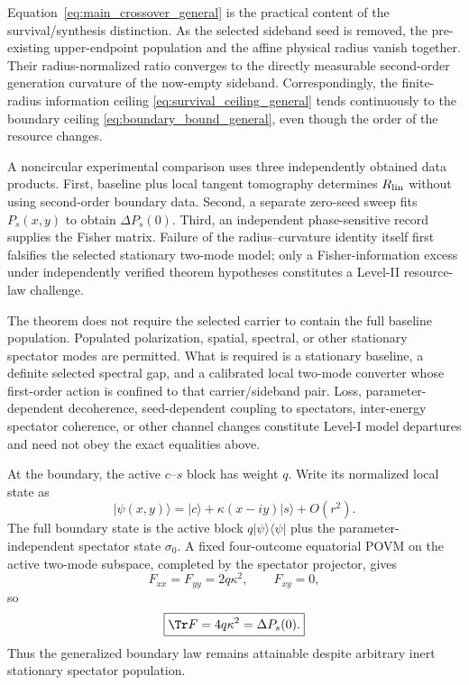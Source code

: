 Equation~\eqref{eq:main_crossover_general} is the practical content of the survival/synthesis distinction. As the selected sideband seed is removed, the pre-existing upper-endpoint population and the affine physical radius vanish together. Their radius-normalized ratio converges to the directly measurable second-order generation curvature of the now-empty sideband. Correspondingly, the finite-radius information ceiling \eqref{eq:survival_ceiling_general} tends continuously to the boundary ceiling \eqref{eq:boundary_bound_general}, even though the order of the resource changes.

A noncircular experimental comparison uses three independently obtained data products. First, baseline plus local tangent tomography determines $R_{\rm lin}$ without using second-order boundary data. Second, a separate zero-seed sweep fits $P_s(x,y)$ to obtain $\Delta P_s(0)$. Third, an independent phase-sensitive record supplies the Fisher matrix. Failure of the radius--curvature identity itself first falsifies the selected stationary two-mode model; only a Fisher-information excess under independently verified theorem hypotheses constitutes a Level-II resource-law challenge.

The theorem does not require the selected carrier to contain the full baseline population. Populated polarization, spatial, spectral, or other stationary spectator modes are permitted. What is required is a stationary baseline, a definite selected spectral gap, and a calibrated local two-mode converter whose first-order action is confined to that carrier/sideband pair. Loss, parameter-dependent decoherence, seed-dependent coupling to spectators, inter-energy spectator coherence, or other channel changes constitute Level-I model departures and need not obey the exact equalities above.

At the boundary, the active $c$--$s$ block has weight $q$. Write its normalized local state as
\begin{equation}
|\psi(x,y)\rangle
=|c\rangle+\kappa(x-iy)|s\rangle+O(r^2).
\end{equation}
The full boundary state is the active block $q|\psi\rangle\langle\psi|$ plus the parameter-independent spectator state $\sigma_0$. A fixed four-outcome equatorial POVM on the active two-mode subspace, completed by the spectator projector, gives
\begin{equation}
F_{xx}=F_{yy}=2q\kappa^2,
\qquad F_{xy}=0,
\end{equation}
so
\begin{equation}
\boxed{\Tr F=4q\kappa^2=\Delta P_s(0).}
\label{eq:boundary_saturation_general}
\end{equation}
Thus the generalized boundary law remains attainable despite arbitrary inert stationary spectator population.

